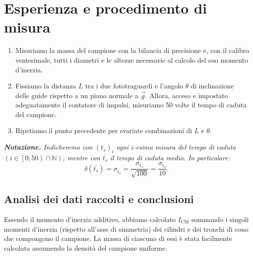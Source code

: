 \documentclass{article}
\begin{document}
\section{Esperienza e procedimento di misura}
\begin{enumerate}
    \item
        Misuriamo la massa del campione con la bilancia di precisione
        e, con il calibro ventesimale, tutti i diametri e le altezze
        necessarie al calcolo del suo momento d'inerzia.
    \item
        Fissiamo la distanza $L$ tra i due fototraguardi
        e l'angolo $\theta$ di inclinazione delle guide
        rispetto a un piano normale a $\vec{g}$.
        Allora, acceso e impostato adeguatamente il contatore di impulsi,
        misuriamo 50 volte il tempo di caduta del campione.
    \item
        Ripetiamo il punto precedente per svariate combinazioni
        di $L$ e $\theta$.

\end{enumerate}

\emph{
    \textbf{Notazione.} Indicheremo con $\left(t_s\right)_i$
    ogni $i$-esima misura del tempo di caduta
    $\left(i\in\left[0;50\right)\cap\mathbb{N}\right)$,
    mentre con $\overline{t_s}$ il tempo di caduta medio.
    In particolare:\[
        \delta\!\left(\overline{t_s}\right) = \sigma_{\overline{t_s}} =
        \frac{\sigma_{t_s}}{\sqrt{100}}   = \frac{\sigma_{t_s}}{10}.
    \]
}

\subsection{Analisi dei dati raccolti e conclusioni}
Essendo il momento d'inerzia additivo, abbiamo calcolato
$I_\text{CM}$ sommando i singoli momenti d'inerzia (rispetto all'asse
di simmetria) dei cilindri e dei tronchi di cono che compongono il
campione. La massa di ciascuno di essi è stata facilmente
calcolata assumendo la densità del campione uniforme.
\end{document}
